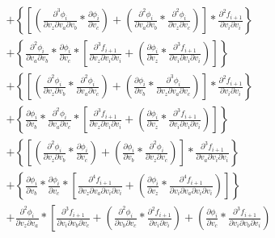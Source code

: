 \documentclass[12pt,letter]{article}
\begin{document}
\begin{equation}
\begin{split}
	\\
	&+
	\left\{\left[\left(\frac{\partial^3 \phi_i}{\partial v_z \partial v_a \partial v_b} * \frac{\partial \phi_i}{\partial v_c}\right) + \left(\frac{\partial^2 \phi_i}{\partial v_a \partial v_b} * \frac{\partial^2 \phi_i}{\partial v_z \partial v_c}\right)\right] * \frac{\partial^2 f_{i+1}}{\partial v_i \partial v_i}\right\}
	\\
	&+
	\left\{\frac{\partial^2 \phi_i}{\partial v_a \partial v_b} * \frac{\partial \phi_i}{\partial v_c} * \left[\frac{\partial^3 f_{i+1}}{\partial v_z \partial v_i \partial v_i} + \left(\frac{\partial \phi_i}{\partial v_z} * \frac{\partial^3 f_{i+1}}{\partial v_i \partial v_i \partial v_i}\right)\right]\right\}
	\\
	&+
	\left\{\left[\left(\frac{\partial^2 \phi_i}{\partial v_z \partial v_b} * \frac{\partial^2 \phi_i}{\partial v_a \partial v_c}\right) + \left(\frac{\partial \phi_i}{\partial v_b} * \frac{\partial^3 \phi_i}{\partial v_z \partial v_a \partial v_c}\right)\right] * \frac{\partial^2 f_{i+1}}{\partial v_i \partial v_i}\right\}
	\\
	&+
	\left\{\frac{\partial \phi_i}{\partial v_b} * \frac{\partial^2 \phi_i}{\partial v_a \partial v_c} * \left[\frac{\partial^3 f_{i+1}}{\partial v_z \partial v_i \partial v_i} + \left(\frac{\partial \phi_i}{\partial v_z} * \frac{\partial^3 f_{i+1}}{\partial v_i \partial v_i \partial v_i}\right)\right]\right\}
	\\
	&+
	\left\{\left[\left(\frac{\partial^2 \phi_i}{\partial v_z \partial v_b} * \frac{\partial \phi_i}{\partial v_c}\right) + \left(\frac{\partial \phi_i}{\partial v_b} * \frac{\partial^2 \phi_i}{\partial v_z \partial v_c}\right)\right] * \frac{\partial^3 f_{i+1}}{\partial v_a \partial v_i \partial v_i}\right\}
	\\
	&+
	\left\{\frac{\partial \phi_i}{\partial v_b} * \frac{\partial \phi_i}{\partial v_c} * \left[\frac{\partial^4 f_{i+1}}{\partial v_z \partial v_a \partial v_i \partial v_i} + \left(\frac{\partial \phi_i}{\partial v_z} * \frac{\partial^4 f_{i+1}}{\partial v_i \partial v_a \partial v_i \partial v_i}\right)\right]\right\}
	\\
	&+
	\frac{\partial^2 \phi_i}{\partial v_z \partial v_a} * 
	\left[\frac{\partial^3 f_{i+1}}{\partial v_i \partial v_b \partial v_c} + 
	\left(\frac{\partial^2 \phi_i}{\partial v_b \partial v_c} * \frac{\partial^2 f_{i+1}}{\partial v_i \partial v_i}\right) + 
	\left(\frac{\partial \phi_i}{\partial v_c} * \frac{\partial^3 f_{i+1}}{\partial v_i \partial v_b \partial v_i}\right)
	\right.

\end{split}
\end{equation}
\end{document}
